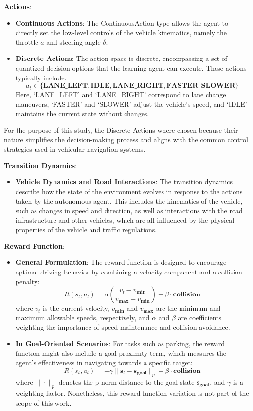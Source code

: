 \documentclass{article}
\begin{document}
\textbf{Actions}:
\begin{itemize}
  \item \textbf{Continuous Actions}: The ContinuousAction type allows the agent to directly set the low-level controls of the vehicle kinematics, namely the throttle $a$ and steering angle $\delta$.
  \item \textbf{Discrete Actions}: The action space is discrete, encompassing a set of quantized decision options that the learning agent can execute. These actions typically include:
    \[
    a_t \in \{\mathbf{LANE\_LEFT}, \mathbf{IDLE}, \mathbf{LANE\_RIGHT}, \mathbf{FASTER}, \mathbf{SLOWER}\}
    \]
  Here, `LANE\_LEFT' and `LANE\_RIGHT' correspond to lane change maneuvers, `FASTER' and `SLOWER' adjust the vehicle's speed, and `IDLE' maintains the current state without changes.
\end{itemize}

For the purpose of this study, the Discrete Actions where chosen because their nature simplifies the decision-making process and aligns with the common control strategies used in vehicular navigation systems.

\textbf{Transition Dynamics}:
\begin{itemize}
  \item \textbf{Vehicle Dynamics and Road Interactions}: The transition dynamics describe how the state of the environment evolves in response to the actions taken by the autonomous agent. This includes the kinematics of the vehicle, such as changes in speed and direction, as well as interactions with the road infrastructure and other vehicles, which are all influenced by the physical properties of the vehicle and traffic regulations.
\end{itemize}

\textbf{Reward Function}:
\begin{itemize}
  \item \textbf{General Formulation}: The reward function is designed to encourage optimal driving behavior by combining a velocity component and a collision penalty:
    \[
    R(s_t, a_t) = \alpha \left(\frac{v_t - v_{\mathbf{min}}}{v_{\mathbf{max}} - v_{\mathbf{min}}}\right) - \beta \cdot \mathbf{collision}
    \]
  where $v_t$ is the current velocity, $v_{\mathbf{min}}$ and $v_{\mathbf{max}}$ are the minimum and maximum allowable speeds, respectively, and $\alpha$ and $\beta$ are coefficients weighting the importance of speed maintenance and collision avoidance.
  
  \item \textbf{In Goal-Oriented Scenarios}: For tasks such as parking, the reward function might also include a goal proximity term, which measures the agent's effectiveness in navigating towards a specific target:
    \[
    R(s_t, a_t) = -\gamma \|\mathbf{s}_t - \mathbf{s}_{\mathbf{goal}}\|_p - \beta \cdot \mathbf{collision}
    \]
  where $\|\cdot\|_p$ denotes the p-norm distance to the goal state $\mathbf{s}_{\mathbf{goal}}$, and $\gamma$ is a weighting factor. Nonetheless, this reward function variation is not part of the scope of this work.
\end{itemize}
\end{document}
